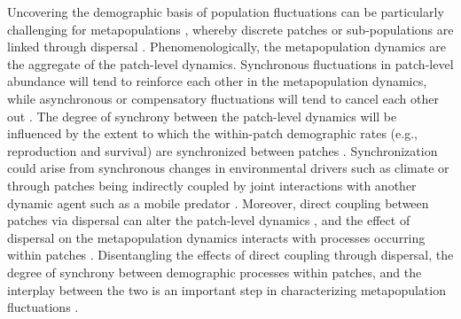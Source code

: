 \documentclass[11pt]{article}
\begin{document}
Uncovering the demographic basis of population fluctuations can be particularly challenging
for metapopulations
\citep{bjornstad1999spatial},
whereby discrete patches or sub-populations are linked through dispersal
\citep{hanski1998}.
Phenomenologically, the metapopulation dynamics are the aggregate of the patch-level dynamics.
Synchronous fluctuations in patch-level abundance will tend to reinforce each other in the metapopulation dynamics,
while asynchronous or compensatory fluctuations will tend to cancel each other out
\citep{liebhold2004spatial}.
The degree of synchrony between the patch-level dynamics will be influenced
by the extent to which the within-patch demographic rates
(e.g., reproduction and survival) are synchronized between patches
\citep{ranta1995synchrony, liebhold2004spatial}.
Synchronization could arise from synchronous changes in environmental
drivers such as climate
\citep{moran1953}
or through patches being indirectly coupled by joint interactions with another
dynamic agent such as a mobile predator
\citep{ims2000, gilg2009}.
Moreover, direct coupling between patches via dispersal can alter the patch-level dynamics
\citep{liebhold2004spatial},
and the effect of dispersal on the metapopulation dynamics interacts
with processes occurring within patches
\citep{ranta1995synchrony, kendall2000dispersal, goldwyn2008}.
Disentangling the effects of direct coupling through dispersal,
the degree of synchrony between demographic processes within patches,
and the interplay between the two
is an important step in characterizing metapopulation fluctuations
\citep{liebhold2004spatial, abbott2011}.
\end{document}
